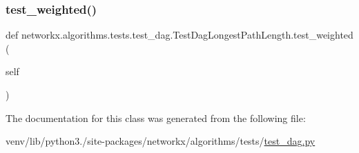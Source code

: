 \subsubsection{\texorpdfstring{test\+\_\+weighted()}{test\_weighted()}}
{\footnotesize\ttfamily def networkx.\+algorithms.\+tests.\+test\+\_\+dag.\+Test\+Dag\+Longest\+Path\+Length.\+test\+\_\+weighted (\begin{DoxyParamCaption}\item[{}]{self }\end{DoxyParamCaption})}



The documentation for this class was generated from the following file\+:\begin{DoxyCompactItemize}
\item 
venv/lib/python3./site-\/packages/networkx/algorithms/tests/\hyperlink{test__dag_8py}{test\+\_\+dag.\+py}\end{DoxyCompactItemize}
